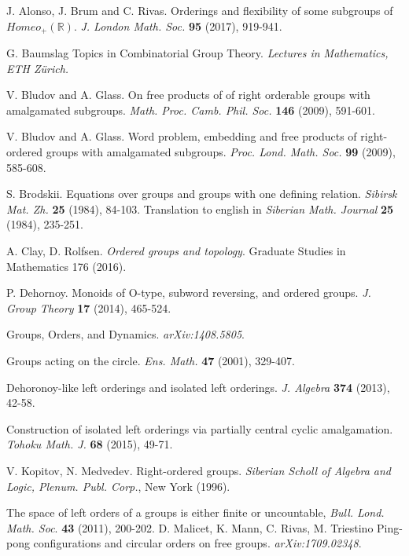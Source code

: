 \documentclass[12pt]{article}
\newcommand{\R}{\mathbb{R}}
\theoremstyle{definition}
\begin{document}
% 
\begin{small}
% 
\begin{thebibliography}{Dillo 83}

 {\sc J. Alonso, J. Brum and C. Rivas.}
Orderings and flexibility of some subgroups of $Homeo_{+}(\R)$. 
{\em J. London Math. Soc.} {\bf 95} (2017), 919-941.

 {\sc G. Baumslag} Topics in Combinatorial Group Theory. {\em Lectures in Mathematics, ETH Z\"urich.}

 {\sc V. Bludov and A. Glass.}
On free products of of right orderable groups with amalgamated subgroups.
{\em Math. Proc. Camb. Phil. Soc.} {\bf 146} (2009), 591-601.

 {\sc V. Bludov and A. Glass.}
Word problem, embedding and free products of right-ordered groups with amalgamated subgroups. {\em Proc. Lond. Math. Soc.} {\bf 99} (2009), 585-608.


 {\sc S. Brodskii.} Equations over groups and groups with one defining relation. {\em Sibirsk Mat. Zh.} {\bf 25} (1984), 84-103. Translation to english in {\em Siberian Math. Journal} {\bf 25} (1984), 235-251.

 {\sc A. Clay, D. Rolfsen.} {\em Ordered groups and topology}.
Graduate Studies in Mathematics 176 (2016).

 {\sc P. Dehornoy.} Monoids of O-type, subword reversing, and ordered groups. {\em J. Group Theory} {\bf 17} (2014), 465-524.

 Groups, Orders, and Dynamics. 
{\em arXiv:1408.5805}.

 Groups acting on the circle. {\em Ens. Math.} {\bf 47} (2001), 329-407.

 Dehoronoy-like left orderings and isolated left orderings. {\em J. Algebra} {\bf 374} (2013), 42-58.

 Construction of isolated left orderings via partially central cyclic amalgamation. {\em Tohoku Math. J.} {\bf 68} (2015), 49-71.
 
 {\sc V. Kopitov, N. Medvedev.} Right-ordered groups.
{\em Siberian Scholl of Algebra and Logic, Plenum. Publ. Corp.}, New York (1996).

  The space of left orders of a groups is either finite or uncountable, {\em Bull. Lond. Math. Soc}. {\bf 43} (2011), 200-202.
 {\sc  D. Malicet, K. Mann, C. Rivas, M. Triestino} Ping-pong configurations and circular orders on free groups. {\em  	arXiv:1709.02348}.



\end{thebibliography}
\end{small}
\end{document}
